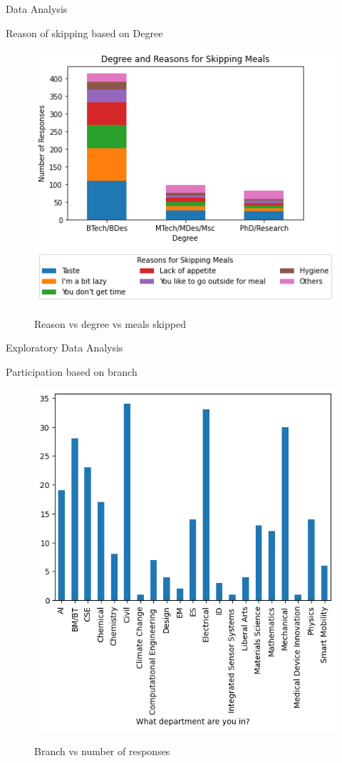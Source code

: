 \documentclass{beamer}
\begin{document}
\begin{frame}{Data Analysis}
\begin{block}{Reason of skipping based on Degree}
\begin{figure}
      \centering
    \caption{Reason vs degree vs meals skipped}
    \includegraphics[scale = 0.55]{Meal Skipping - Reason Seg chart.png}  
    \label{gender_seg}
\end{figure}
\end{block}
\end{frame}
\begin{frame}{Exploratory Data Analysis}
\begin{block}{Participation based on branch}
\begin{figure}
      \centering
    \caption{Branch vs number of responses}
    \includegraphics[scale = 0.55]{bar_department.png}  
    \label{fig:side-by-side}
\end{figure}
\end{block}
\end{frame}
\end{document}
